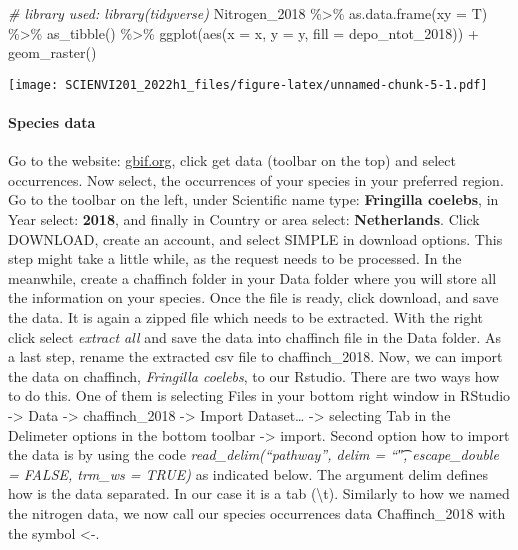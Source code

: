 \documentclass[
]{article}
\newenvironment{Shaded}{\begin{snugshade}}{\end{snugshade}}
\newcommand{\AttributeTok}[1]{\textcolor[rgb]{0.77,0.63,0.00}{#1}}
\newcommand{\CommentTok}[1]{\textcolor[rgb]{0.56,0.35,0.01}{\textit{#1}}}
\newcommand{\FunctionTok}[1]{\textcolor[rgb]{0.00,0.00,0.00}{#1}}
\newcommand{\NormalTok}[1]{#1}
\newcommand{\SpecialCharTok}[1]{\textcolor[rgb]{0.00,0.00,0.00}{#1}}
\begin{document}
\begin{Shaded}
\begin{Highlighting}[]
\CommentTok{\# library used: library(tidyverse)}
\NormalTok{Nitrogen\_2018 }\SpecialCharTok{\%\textgreater{}\%} 
  \FunctionTok{as.data.frame}\NormalTok{(}\AttributeTok{xy =}\NormalTok{ T) }\SpecialCharTok{\%\textgreater{}\%} 
  \FunctionTok{as\_tibble}\NormalTok{() }\SpecialCharTok{\%\textgreater{}\%} 
  \FunctionTok{ggplot}\NormalTok{(}\FunctionTok{aes}\NormalTok{(}\AttributeTok{x =}\NormalTok{ x, }\AttributeTok{y =}\NormalTok{ y, }\AttributeTok{fill =}\NormalTok{ depo\_ntot\_2018)) }\SpecialCharTok{+} 
  \FunctionTok{geom\_raster}\NormalTok{()}
\end{Highlighting}
\end{Shaded}

\texttt{[image: SCIENVI201\_2022h1\_files/figure-latex/unnamed-chunk-5-1.pdf]}

\hypertarget{species-data}{%
\paragraph{Species data}\label{species-data}}

Go to the website: \href{https://www.gbif.org/}{gbif.org}, click get
data (toolbar on the top) and select occurrences. Now select, the
occurrences of your species in your preferred region. Go to the toolbar
on the left, under Scientific name type: \textbf{Fringilla coelebs}, in
Year select: \textbf{2018}, and finally in Country or area select:
\textbf{Netherlands}. Click DOWNLOAD, create an account, and select
SIMPLE in download options. This step might take a little while, as the
request needs to be processed. In the meanwhile, create a chaffinch
folder in your Data folder where you will store all the information on
your species. Once the file is ready, click download, and save the data.
It is again a zipped file which needs to be extracted. With the right
click select \emph{extract all} and save the data into chaffinch file in
the Data folder. As a last step, rename the extracted csv file to
chaffinch\_2018. Now, we can import the data on chaffinch,
\emph{Fringilla coelebs}, to our Rstudio. There are two ways how to do
this. One of them is selecting Files in your bottom right window in
RStudio -\textgreater{} Data -\textgreater{} chaffinch\_2018
-\textgreater{} Import Dataset\ldots{} -\textgreater{} selecting Tab in
the Delimeter options in the bottom toolbar -\textgreater{} import.
Second option how to import the data is by using the code
\emph{read\_delim(``pathway'', delim = ``\t", escape\_double = FALSE,
trm\_ws = TRUE)} as indicated below. The argument delim defines how is
the data separated. In our case it is a tab (\textbackslash t).
Similarly to how we named the nitrogen data, we now call our species
occurrences data Chaffinch\_2018 with the symbol \textless-.
\end{document}
